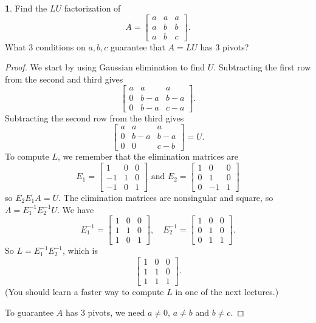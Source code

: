\documentclass{article}
\theoremstyle{definition}
\newtheorem{prob}{}
\begin{document}
\begin{prob}
	Find the $LU$ factorization of 
	\[A=\begin{bmatrix}
		a & a & a\\
		a & b & b\\
		a & b& c
	\end{bmatrix}.\]
What 3 conditions on $a, b, c$ guarantee that $A=LU$ has 3 pivots?
\end{prob}
\begin{proof}
	We start by using Gaussian elimination to find $U$. Subtracting the first row from the second and third gives
	\[\begin{bmatrix}
		a & a & a\\
		0 & b-a & b-a\\
		0 & b-a& c-a
	\end{bmatrix}.\]
Subtracting the second row from the third gives 
	\[\begin{bmatrix}
	a & a & a\\
	0 & b-a & b-a\\
	0 & 0& c-b
\end{bmatrix}=U.\]
To compute $L$, we remember that the elimination matrices are 
\[E_1=	\begin{bmatrix}
	1 & 0 & 0\\
	-1 & 1& 0\\
	-1& 0& 1
\end{bmatrix}\text{ and }E_2=	\begin{bmatrix}
	1 & 0 & 0\\
	0& 1& 0\\
	0& -1& 1
\end{bmatrix}\]
so $E_2 E_1 A= U$. The elimination matrices are nonsingular and square, so $A=E_1^{-1} E_2^{-1} U$. We have 
\[E_1^{-1}=	\begin{bmatrix}
	1 & 0 & 0\\
	1 & 1& 0\\
	1& 0& 1
\end{bmatrix}, \quad
E_2^{-1}=	\begin{bmatrix}
	1 & 0 & 0\\
	0& 1& 0\\
	0& 1& 1
\end{bmatrix}.\]
So $L= E_1^{-1} E_2^{-1}$, which is
\[\begin{bmatrix}
	1 & 0 & 0\\
	1& 1& 0\\
	1& 1& 1
\end{bmatrix}.\]
(You should learn a faster way to compute $L$ in one of the next lectures.)

To guarantee $A$ has 3 pivots, we need $a \neq 0$, $a \neq b$ and $b \neq c$.
\end{proof}
\end{document}
